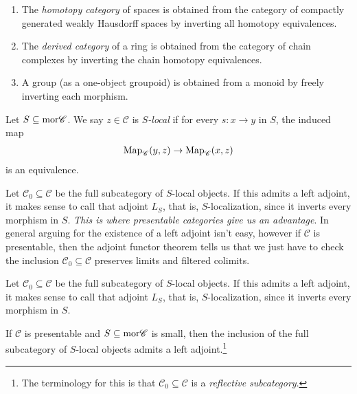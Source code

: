 \documentclass[11pt,openany]{book}
\begin{document}
\begin{example} $\ $
\begin{enumerate}
    \item The \textit{homotopy category} of spaces is obtained from the category of compactly generated weakly Hausdorff spaces by inverting all homotopy equivalences.
    \item The \textit{derived category} of a ring is obtained from the category of chain complexes by inverting the chain homotopy equivalences.
    \item A group (as a one-object groupoid) is obtained from a monoid by freely inverting each morphism.
\end{enumerate}
\end{example}



\begin{definition} \cite[5.5.4.1]{HTT} Let $S \subseteq \mathrm{mor} \mathscr{C}$. We say $z\in \mathscr{C}$ is $S$\textit{-local} if for every $s \colon x \to y$ in $S$, the induced map
\begin{align*}
    \mathrm{Map}_{\mathscr{C}}(y,z) \to \mathrm{Map}_{\mathscr{C}}(x,z)
\end{align*}
is an equivalence.
\end{definition}

\begin{remark} Let $\mathscr{C}_0 \subseteq \mathscr{C}$ be the full subcategory of $S$-local objects. If this admits a left adjoint, it makes sense to call that adjoint $L_S$, that is, $S$-localization, since it inverts every morphism in $S$. \textit{This is where presentable categories give us an advantage}. In general arguing for the existence of a left adjoint isn't easy, however if $\mathscr{C}$ is presentable, then the adjoint functor theorem tells us that we just have to check the inclusion $\mathscr{C}_0 \subseteq \mathscr{C}$ preserves limits and filtered colimits.
\end{remark}
Let $\mathscr{C}_0 \subseteq \mathscr{C}$ be the full subcategory of $S$-local objects. If this admits a left adjoint, it makes sense to call that adjoint $L_S$, that is, $S$-localization, since it inverts every morphism in $S$.

\begin{proposition}\label{prop:localization-at-set-of-morphisms} 
\cite[5.5.4.15]{HTT} If $\mathscr{C}$ is presentable and $S \subseteq \mathrm{mor} \mathscr{C}$ is small, then the inclusion of the full subcategory of $S$-local objects admits a left adjoint.\footnote{The terminology for this is that $\mathscr{C}_0 \subseteq \mathscr{C}$ is a \textit{reflective subcategory}.}
\end{proposition}
\end{document}
